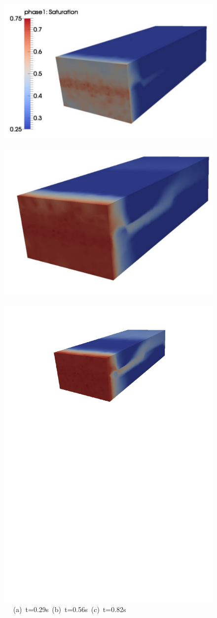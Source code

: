 \begin{landscape}
  \begin{figure}[ht]
  \vbox{\vspace{-.5cm}
      \hbox{\includegraphics[width=.5\textwidth, height=.45\textwidth]{./Pics1/3D_Channel/3D_channel_sat_adapt_30.pdf} 
            \includegraphics[width=.5\textwidth]{./Pics1/3D_Channel/3D_channel_sat_adapt_60.pdf}
            \includegraphics[width=.5\textwidth]{./Pics1/3D_Channel/3D_channel_sat_adapt_90.pdf} }
      \hbox{\hspace{3.0cm} (a) t=0.29s \hspace{4.cm} (b) t=0.56s \hspace{4.cm} (c) t=0.82s}
}
\end{figure}
\end{landscape}
